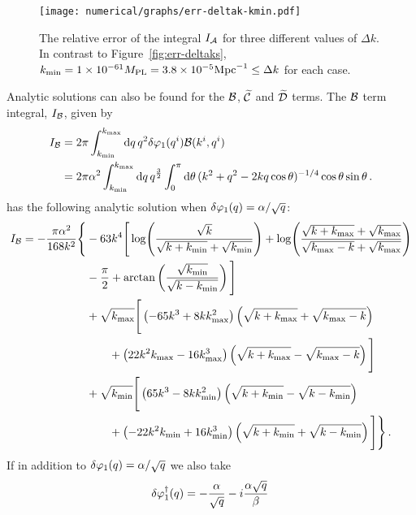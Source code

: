 \begin{figure}[htb]
 \centering
 \texttt{[image: numerical/graphs/err-deltak-kmin.pdf]}
 \caption[Relative error of $I_\A$ with fixed $\kmin$]{The 
relative error of the integral $I_\A$ for three different values of $\Delta k$. In
contrast to Figure~\ref{fig:err-deltaks}, $k_{\mathrm{min}}=1\times 10^{-61}M_{\mathrm{PL}}=3.8\times 10^{-5}\mathrm{Mpc}^{-1} \le
\Delta k$ for each case.}
 \label{fig:err-deltak-kmin}
\end{figure}
 
% 
% 
Analytic solutions can also be found for the $\mathcal{B}$, $\widetilde{\mathcal{C}}$ and $\widetilde{\mathcal{D}}$ terms.
The $\mathcal{B}$ term integral, $I_{\mathcal{B}}$, given by
% 
\begin{align}
 \label{eq:bintegral-num}
I_\B &= 2\pi \int_{\kmin}^{\kmax} \d q\, q^2\dvp1(\qvi)\B(\kvi,\qvi) \nonumber\\
% 
     &= 2\pi\alpha^2 \int_{\kmin}^{\kmax} \d q\, q^{\frac{3}{2}}
\int_{0}^{\pi} \d\theta\, (k^2 + q^2 -2k q \cos{\theta})^{-1/4}
\cos{\theta}\sin{\theta}\,. 
\end{align}
% 
has the following analytic solution when $\delta\varphi_{1}(q) = \alpha/\sqrt{q}$:
% 
\begin{align}
\label{eq:intb-soln-num}
 I_\B = -\frac{\pi\alpha^2}{168 k^2}\Bigg\{ 
	&-63 k^4 \Bigg[ \log\Biggl(\frac{\sqrt{k}}{\sqrt{k+\kmin} + \sqrt{\kmin}}
			    \Biggr)
	 + \log\Biggl( \frac{\sqrt{k+\kmax} +\sqrt{\kmax}}{\sqrt{\kmax-k} +
		      \sqrt{\kmax}}\Biggr) \nonumber \\
	&-\frac{\pi}{2} + \arctan\left( \frac{\sqrt{\kmin}}{\sqrt{k-\kmin}}\right)
	\Bigg] \nonumber\\
% 
        &+\sqrt{\kmax}\Bigg[ \left(-65k^3 + 8k\kmax^2 \right)\left(\sqrt{k+\kmax} +
	  \sqrt{\kmax-k}\right) \nonumber \\
	&\qquad +\left(22k^2\kmax -16\kmax^3\right) \left(\sqrt{k+\kmax} -
         \sqrt{\kmax -k} \right) \Bigg] \nonumber \\
	&+\sqrt{\kmin}\Bigg[ \left(65k^3 - 8k\kmin^2 \right)\left(\sqrt{k+\kmin} -
	  \sqrt{k-\kmin}\right) \nonumber \\
	&\qquad +\left(-22k^2\kmin +16\kmin^3\right) \left(\sqrt{k+\kmin} +
         \sqrt{k-\kmin} \right) \Bigg] \Bigg\} \,.
\end{align}
% 
If in addition to $\delta\varphi_{1}(q) = \alpha/\sqrt{q}$ we also take
% 
\begin{equation}
 \delta\varphi_{1}^{\dagger}(q) = -\frac{\alpha}{\sqrt{q}} -i\frac{\alpha\sqrt{q}}{\beta}\,
\end{equation}
